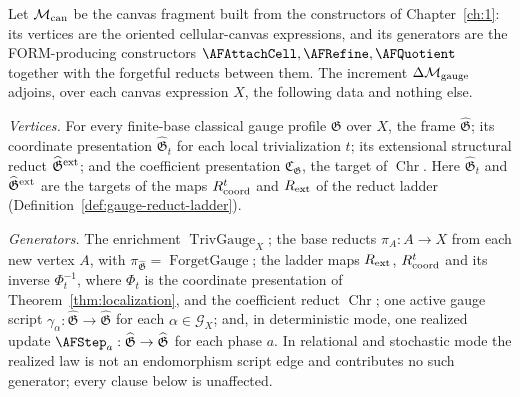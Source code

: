\begin{definition}
\label{def:gauge-increment}
Let $\mathcal M_{\rm can}$ be the canvas fragment built from the constructors
of Chapter~\ref{ch:1}: its vertices are
the oriented cellular-canvas expressions, and its generators are the
FORM-producing constructors $\AFAttachCell,\AFRefine,\AFQuotient$ together
with the forgetful reducts between them.  The increment
$\Delta\mathcal M_{\rm gauge}$ adjoins, over each canvas expression $X$, the
following data and nothing else.

\emph{Vertices.}  For every finite-base classical gauge profile $\mathfrak G$ over $X$,
the frame $\widehat{\mathfrak G}$; its coordinate presentation
$\widehat{\mathfrak G}_t$ for each local trivialization $t$; its extensional
structural reduct $\widehat{\mathfrak G}^{\rm ext}$; and the coefficient
presentation $\mathfrak C_{\mathfrak G}$, the target of $\operatorname{Chr}$.
Here $\widehat{\mathfrak G}_t$ and $\widehat{\mathfrak G}^{\rm ext}$ are the
targets of the maps $R_{\rm coord}^t$ and $R_{\rm ext}$ of the reduct ladder
(Definition~\ref{def:gauge-reduct-ladder}).

\emph{Generators.}  The enrichment $\operatorname{TrivGauge}_X$; the base
reducts $\pi_A:A\to X$ from each new vertex $A$, with
$\pi_{\widehat{\mathfrak G}}=\operatorname{ForgetGauge}$; the ladder maps
$R_{\rm ext}$, $R_{\rm coord}^t$ and its inverse $\Phi_t^{-1}$, where $\Phi_t$
is the coordinate presentation of Theorem~\ref{thm:localization}, and the
coefficient reduct $\operatorname{Chr}$; one active gauge script
$\gamma_\alpha:\widehat{\mathfrak G}\to\widehat{\mathfrak G}$ for each
$\alpha\in\mathscr G_X$; and, in deterministic mode, one realized update
$\AFStep_a:\widehat{\mathfrak G}\to\widehat{\mathfrak G}$ for each phase $a$.
In relational and stochastic mode the realized law is not an endomorphism
script edge and contributes no such generator; every clause below is
unaffected.


\end{definition}
